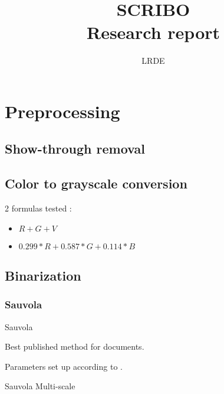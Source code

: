 \documentclass[a4]{book}
\title{SCRIBO\\
  \large{Research report} }
\author{LRDE}
\date{}
\begin{document}
\maketitle



\chapter{Preprocessing}



\section{Show-through removal}


\section{Color to grayscale conversion}

2 formulas tested :
\begin{itemize}
\item $R + G + V$
\item $0.299 * R + 0.587 * G + 0.114 * B$
\end{itemize}


\section{Binarization}



\subsection{Sauvola}
\par{Sauvola}

\cite{Sauvola}

Best published method for documents.

Parameters set up according to \cite{Badekas}.

\par{Sauvola Multi-scale}
\end{document}
